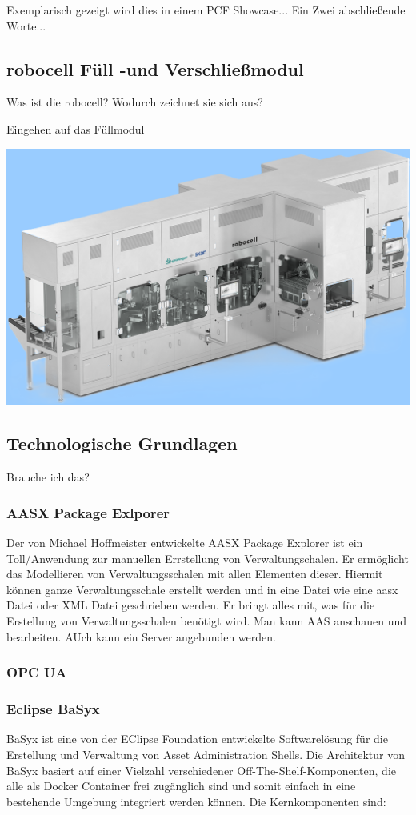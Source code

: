 Exemplarisch gezeigt wird dies in einem PCF Showcase...
Ein Zwei abschließende Worte...


%

\subsection{robocell Füll -und Verschließmodul}

Was ist die robocell? Wodurch zeichnet sie sich aus?

Eingehen auf das Füllmodul


\includegraphics{Bilder/robocell_FS2_rgb_Logo.png}
\subsection{Technologische Grundlagen}
Brauche ich das?
\subsubsection{AASX Package Exlporer}
Der von Michael Hoffmeister entwickelte AASX Package Explorer ist ein Toll/Anwendung zur manuellen Errstellung von Verwaltungschalen.
Er ermöglicht das Modellieren von Verwaltungsschalen mit allen Elementen dieser.
Hiermit können ganze Verwaltungsschale erstellt werden und in eine Datei wie eine aasx Datei oder XML Datei geschrieben werden.
Er bringt alles mit, was für die Erstellung von Verwaltungsschalen benötigt wird.
Man kann AAS anschauen und bearbeiten.
AUch kann ein Server angebunden werden.
\subsubsection{OPC UA}
\subsubsection{Eclipse BaSyx }
BaSyx ist eine von der EClipse Foundation entwickelte Softwarelösung für die Erstellung und Verwaltung von Asset Administration Shells.
Die Architektur von BaSyx basiert auf einer Vielzahl verschiedener Off-The-Shelf-Komponenten, die alle als Docker Container frei zugänglich sind und somit einfach in eine bestehende Umgebung integriert werden können. 
Die Kernkomponenten sind:

